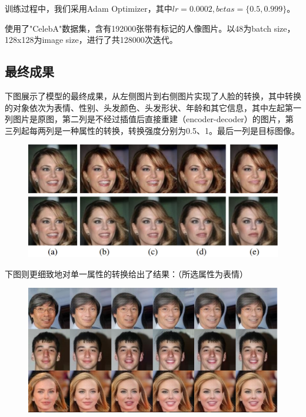 \documentclass[UTF8,a4paper，12pt]{article}
\theoremstyle{theorem}
\theoremstyle{definition}
\begin{document}
训练过程中，我们采用Adam Optimizer，其中$lr = 0.0002, betas = \{0.5, 0.999\}$。

使用了"CelebA"数据集，含有192000张带有标记的人像图片。以48为batch size，128x128为image size，进行了共128000次迭代。

\subsection{最终成果}

下图展示了模型的最终成果，从左侧图片到右侧图片实现了人脸的转换，其中转换的对象依次为表情、性别、头发颜色、头发形状、年龄和其它信息，其中左起第一列图片是原图，第二列是不经过插值后直接重建（encoder-decoder）的图片，第三列起每两列是一种属性的转换，转换强度分别为0.5、1。最后一列是目标图像。

\newpage
\begin{figure}[htbp]
	\centering
	\includegraphics[width=1.0\textwidth]{assets/11}
	\caption{}
\end{figure}

下图则更细致地对单一属性的转换给出了结果：（所选属性为表情）

\begin{figure}[htbp]
	\centering
	\includegraphics[width=1.0\textwidth]{assets/12}
	\caption{}
\end{figure}
\end{document}
